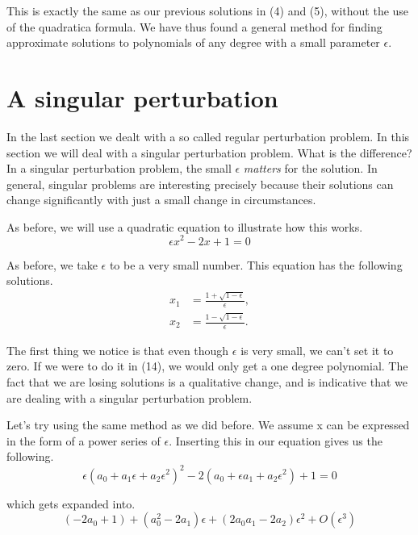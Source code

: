 \documentclass[12pt]{article}
\begin{document}
This is exactly the same as our previous solutions in (4) and (5),
without the use of the quadratica formula. We have thus found a
general method for finding approximate solutions to polynomials of any
degree with a small parameter $\epsilon$.

\section{A singular perturbation}

In the last section we dealt with a so called regular perturbation problem. In this section
we will deal with a singular perturbation problem. What is the difference? In a
singular perturbation problem, the small $\epsilon$ \textit{matters} for the
solution. In general, singular problems are interesting precisely
because their solutions can change significantly with just a small change in
circumstances.

As before, we will use a quadratic equation to illustrate how this works.
\begin{equation}
\epsilon x^2 - 2 x + 1 = 0
\end{equation}

As before, we take $\epsilon$ to be a very small number. This equation has the
following solutions.
\begin{align}
x_1 &= \frac{1 + \sqrt{1 - \epsilon}}{\epsilon}, \\
x_2 &= \frac{1 - \sqrt{1 - \epsilon}}{\epsilon}.
\end{align}

The first thing we notice is that even though $\epsilon$ is very small, we can't
set it to zero. If we were to do it in (14), we would only get a one degree
polynomial. The fact that we are losing solutions is a qualitative change, and
is indicative that we are dealing with a singular perturbation problem.

Let's try using the same method as we did before. We assume x can be
expressed in the form of a power series of $\epsilon$. Inserting this
in our equation gives us the following.
\begin{equation}
\epsilon (a_0 + a_1 \epsilon + a_2 \epsilon^2)^2 - 2(a_0 + \epsilon a_1 +
a_2 \epsilon^2) + 1 = 0
\end{equation}

which gets expanded into.
\begin{equation}
(- 2 a_0 + 1) + (a_0^2 - 2 a_1) \epsilon + (2 a_0 a_1 -2 a_2) \epsilon^2 +
O(\epsilon^3)
\end{equation}
\end{document}
